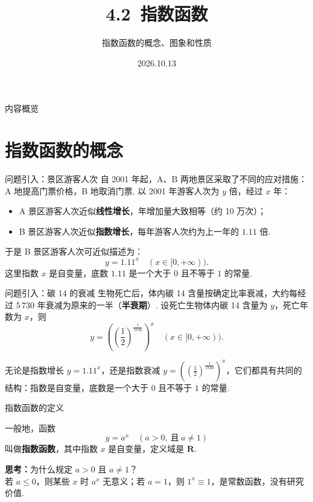 \documentclass[aspectratio=169,13pt,t] {beamer}
\title[4.2指数函数]{4.2\ 指数函数}
\subtitle{指数函数的概念、图象和性质}
\author[好好学习，努力向上]{}
\institute{}
\date{2026.10.13}
\theoremstyle{definition}
\begin{document}
\begin{frame}{}
	\titlepage
\end{frame}

\begin{frame}{内容概览}
	\tableofcontents
\end{frame}

\section{指数函数的概念}

\begin{frame}{问题引入：景区游客人次}
	自 2001 年起，A、B 两地景区采取了不同的应对措施：A 地提高门票价格，B 地取消门票. 以 2001 年游客人次为 \(y\) 倍，经过 \(x\) 年：
	\begin{itemize}
		\item A 景区游客人次近似\textbf{线性增长}，年增加量大致相等（约 10 万次）；
		\item B 景区游客人次近似\textbf{指数增长}，每年游客人次约为上一年的 \(1.11\) 倍.
	\end{itemize}
	\vspace{1em}
	\pause
	于是 B 景区游客人次可近似描述为：
	\[
		y=1.11^x\quad (x\in[0,+\infty)).
	\]
	这里指数 \(x\) 是自变量，底数 \(1.11\) 是一个大于 \(0\) 且不等于 \(1\) 的常量.
\end{frame}

\begin{frame}{问题引入：碳 14 的衰减}
	生物死亡后，体内碳 14 含量按确定比率衰减，大约每经过 \(5\,730\) 年衰减为原来的一半（\textbf{半衰期}）.
	\vspace{0.5em}
	设死亡生物体内碳 14 含量为 \(y\)，死亡年数为 \(x\)，则
	\[
		y=\left(\left(\frac12\right)^{\frac{1}{5730}}\right)^x\quad (x\in[0,+\infty)).
	\]
	\vspace{1em}
	\pause
	\begin{summarybox-answer}
		无论是指数增长 \(y=1.11^x\)，还是指数衰减 \(y=\left(\left(\frac12\right)^{\frac{1}{5730}}\right)^x\)，它们都具有共同的结构：指数是自变量，底数是一个大于 \(0\) 且不等于 \(1\) 的常量.
	\end{summarybox-answer}
\end{frame}

\begin{frame}{指数函数的定义}
	\begin{summarybox}
		一般地，函数
		\[
			\boxed{\,y=a^x\quad (a>0,\ \text{且}\ a\neq 1)\,}
		\]
		叫做\textbf{指数函数}，其中指数 \(x\) 是自变量，定义域是 \(\mathbf{R}\).
	\end{summarybox}
	\vspace{1em}
	\pause
	\begin{summarybox-answer}
		\textbf{思考：}为什么规定 \(a>0\) 且 \(a\neq 1\)？\\
		若 \(a\leqslant 0\)，则某些 \(x\) 时 \(a^x\) 无意义；若 \(a=1\)，则 \(1^x\equiv 1\)，是常数函数，没有研究价值.
	\end{summarybox-answer}
\end{frame}
\end{document}
